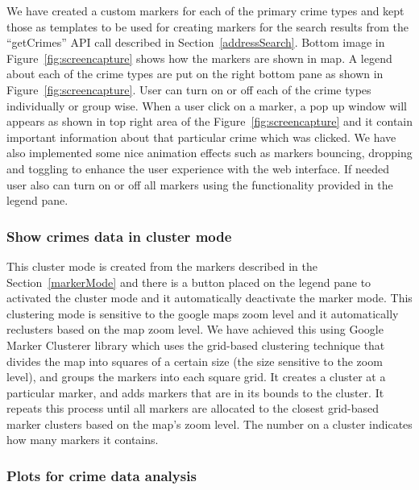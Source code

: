 We have created a custom markers for each of the primary crime types
and kept those as templates to be used for creating markers for the
search results from the ``getCrimes'' API call described in
Section~\ref{addressSearch}. Bottom image in
Figure~\ref{fig:screencapture} shows how the markers are shown in
map. A legend about each of the crime types are put on the right
bottom pane as shown in Figure~\ref{fig:screencapture}. User can turn
on or off each of the crime types individually or group wise. When a
user click on a marker, a pop up window will appears as shown in top
right area of the Figure~\ref{fig:screencapture} and it contain
important information about that particular crime which was
clicked. We have also implemented some nice animation effects such as
markers bouncing, dropping and toggling to enhance the user experience
with the web interface. If needed user also can turn on or off all
markers using the functionality provided in the legend pane.

\subsubsection{Show crimes data in cluster mode}\label{clusterMode}

This cluster mode is created from the markers described in the
Section~\ref{markerMode} and there is a button placed on the legend
pane to activated the cluster mode and it automatically deactivate the
marker mode. This clustering mode is sensitive to the google maps zoom
level and it automatically reclusters based on the map zoom level. We
have achieved this using Google Marker Clusterer library which uses
the grid-based clustering technique that divides the map into squares
of a certain size (the size sensitive to the zoom level), and groups
the markers into each square grid. It creates a cluster at a
particular marker, and adds markers that are in its bounds to the
cluster. It repeats this process until all markers are allocated to
the closest grid-based marker clusters based on the map's zoom
level. The number on a cluster indicates how many markers it contains.

\subsubsection{Plots for crime data analysis}\label{plottingData}

